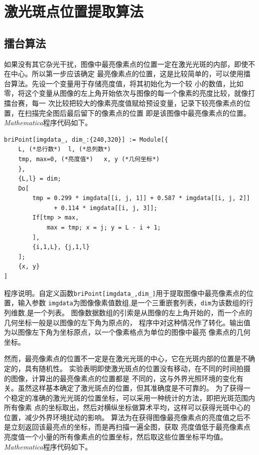 \documentclass[UTF8,a4paper,12pt]{article}
\begin{document}
\section{激光斑点位置提取算法}
\subsection{擂台算法}
如果没有其它杂光干扰，图像中最亮像素点的位置一定在激光光斑的内部，即使不在中心。所以第一步应该确定
最亮像素点的位置，这是比较简单的，可以使用擂台算法。先设一个变量用于存储亮度值，将其初始化为一个较
小的数值，比如零，将这个变量从图像的左上角开始依次与图像的每一个像素的亮度比较，就像打擂台赛，每一
次比较把较大的像素亮度值赋给预设变量，记录下较亮像素点的位置，在扫描完全图后最后留下的像素点的位置
即是该图像中最亮像素点的位置。\textit{Mathematica}程序代码如下。

\begin{verbatim}
briPoint[imgdata_, dim_:{240,320}] := Module[{
    L, (*总行数*)  l, (*总列数*)
    tmp, max=0, (*亮度值*)   x, y (*几何坐标*)
    },
    {L,l} = dim;
    Do[
        tmp = 0.299 * imgdata[[i, j, 1]] + 0.587 * imgdata[[i, j, 2]] 
              + 0.114 * imgdata[[i, j, 3]];
        If[tmp > max,
            max = tmp; x = j; y = L - i + 1;
        ],
        {i,1,L}, {j,1,l}
    ];
    {x, y}
]
\end{verbatim}

程序说明。自定义函数\verb|briPoint[imgdata_,dim_]|用于提取图像中最亮像素点的位置，输入参数
\verb|imgdata|为图像像素值数组,是一个三重嵌套列表，\verb|dim|为该数组的行列维数,是一个列表。
图像数据数组的引索是从图像的左上角开始的，而一个点的几何坐标一般是以图像的左下角为原点的，
程序中对这种情况作了转化。输出值为以图像左下角为坐标原点，以一个像素格点为单位的图像中最亮
像素点的几何坐标。

然而，最亮像素点的位置不一定是在激光光斑的中心，它在光斑内部的位置是不确定的，具有随机性。
实验表明即使激光斑点的位置没有移动，在不同的时间拍摄的图像，计算出的最亮像素点的位置都是
不同的，这与外界光照环境的变化有关。虽然这样基本确定了激光斑点的位置，但其准确度是不可靠的。
为了获得一个稳定的准确的激光光斑的位置坐标，可以采用一种统计的方法，即把光斑范围内所有像素
点的坐标取出，然后对横纵坐标做算术平均，这样可以获得光斑中心的位置，减少外界环境扰动的影响。
算法为在获得图像最亮像素点的亮度值之后不是立刻返回该最亮点的坐标，而是再扫描一遍全图，获取
亮度值低于最亮像素点亮度值一个小量的所有像素点的位置坐标，然后取这些位置坐标平均值。
\textit{Mathematica}程序代码如下。
\end{document}
